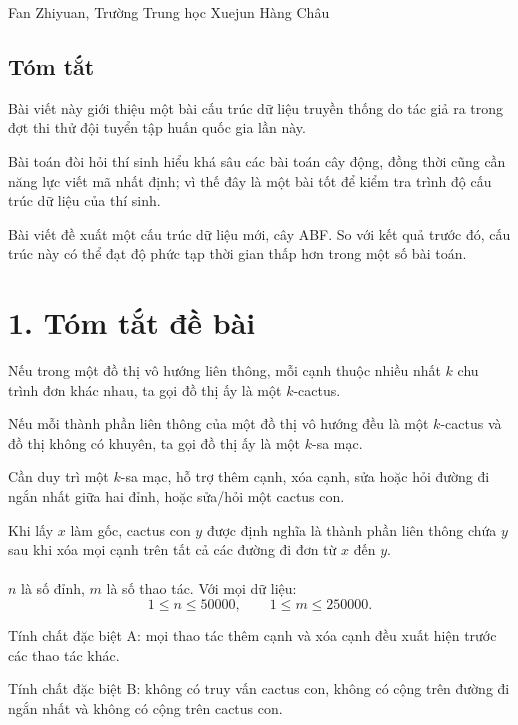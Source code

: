 \documentclass[11pt]{article}
\begin{document}
\begin{center}
Fan Zhiyuan, Trường Trung học Xuejun Hàng Châu
\end{center}

\subsection*{Tóm tắt}

Bài viết này giới thiệu một bài cấu trúc dữ liệu truyền thống do tác giả ra
trong đợt thi thử đội tuyển tập huấn quốc gia lần này.

Bài toán đòi hỏi thí sinh hiểu khá sâu các bài toán cây động, đồng thời cũng
cần năng lực viết mã nhất định; vì thế đây là một bài tốt để kiểm tra trình
độ cấu trúc dữ liệu của thí sinh.

Bài viết đề xuất một cấu trúc dữ liệu mới, cây ABF. So với kết quả trước đó,
cấu trúc này có thể đạt độ phức tạp thời gian thấp hơn trong một số bài toán.

\section*{1. Tóm tắt đề bài}

Nếu trong một đồ thị vô hướng liên thông, mỗi cạnh thuộc nhiều nhất \(k\) chu
trình đơn khác nhau, ta gọi đồ thị ấy là một \(k\)-cactus.

Nếu mỗi thành phần liên thông của một đồ thị vô hướng đều là một \(k\)-cactus
và đồ thị không có khuyên, ta gọi đồ thị ấy là một \(k\)-sa mạc.

Cần duy trì một \(k\)-sa mạc, hỗ trợ thêm cạnh, xóa cạnh, sửa hoặc hỏi đường
đi ngắn nhất giữa hai đỉnh, hoặc sửa/hỏi một cactus con.

Khi lấy \(x\) làm gốc, cactus con \(y\) được định nghĩa là thành phần liên
thông chứa \(y\) sau khi xóa mọi cạnh trên tất cả các đường đi đơn từ \(x\)
đến \(y\).

\paragraph{}
\(n\) là số đỉnh, \(m\) là số thao tác. Với mọi dữ liệu:
\[
  1\le n\le 50000,\qquad 1\le m\le 250000.
\]

Tính chất đặc biệt A: mọi thao tác thêm cạnh và xóa cạnh đều xuất hiện trước
các thao tác khác.

Tính chất đặc biệt B: không có truy vấn cactus con, không có cộng trên đường
đi ngắn nhất và không có cộng trên cactus con.
\end{document}
